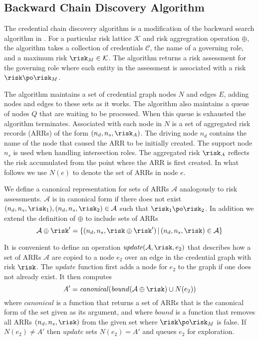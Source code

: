 \subsection{Backward Chain Discovery Algorithm}

The credential chain discovery algorithm is a modification of the
backward search algorithm in \cite{Li:2003-02}. For a particular risk
lattice $\mathcal{K}$ and risk aggregration operation $\oplus$, the
algorithm takes a collection of credentials $\mathcal{C}$, the name of a
governing role, and a maximum risk $\risk_M \in \mathcal{K}$. The
algorithm returns a risk assessment for the governing role where each
entity in the assessment is associated with a risk $\risk \po \risk_M$.

The algorithm maintains a set of credential graph nodes $N$ and edges
$E$, adding nodes and edges to these sets as it works. The algorithm
also maintains a queue of nodes $Q$ that are waiting to be processed.
When this queue is exhausted the algorithm terminates. Associated with
each node in $N$ is a set of aggregated risk records (ARRs) of the form
$(n_d, n_s, \risk_A)$. The driving node $n_d$ contains the name of the
node that caused the ARR to be initially created. The support node $n_s$
is used when handling intersection roles. The aggregated risk $\risk_A$
reflects the risk accumulated from the point where the ARR is first
created. In what follows we use $N(e)$ to denote the set of ARRs in node
$e$.

We define a canonical representation for sets of ARRs $\mathcal{A}$
analogously to risk assessments. $\mathcal{A}$ is in canonical form if
there does not exist $(n_d, n_s, \risk_1), (n_d, n_s, \risk_2) \in
\mathcal{A}$ such that $\risk_1 \po \risk_2$. In addition we extend the
definition of $\oplus$ to include sets of ARRs
$$
\mathcal{A} \oplus \risk' = \{(n_d, n_s, \risk \oplus \risk')\,|\, (n_d,
  n_s, \risk) \in \mathcal{A}\}
$$

It is convenient to define an operation $\mathit{update}(\mathcal{A},
\risk, e_2)$ that describes how a set of ARRs $\mathcal{A}$ are copied
to a node $e_2$ over an edge in the credential graph with risk $\risk$.
The $\mathit{update}$ function first adds a node for $e_2$ to the graph
if one does not already exist. It then computes
$$
A' = \mathit{canonical}(\mathit{bound}(\mathcal{A} \oplus \risk) \cup N(e_2))
$$
where $\mathit{canonical}$ is a function that returns a set of ARRs that
is the canonical form of the set given as its argument, and where
$\mathit{bound}$ is a function that removes all ARRs $(n_d, n_s, \risk)$
from the given set where $\risk \po \risk_M$ is false. If $N(e_2) \ne
A'$ then $\mathit{update}$ sets $N(e_2) = A'$ and queues $e_2$ for
exploration.

